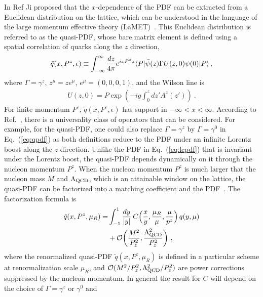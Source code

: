\documentclass[prd,aps,twocolumn,preprintnumbers,showpacs,nofootinbib,superscriptaddress,notitlepage]{revtex4-1}
\newcommand{\beq}{\begin{eqnarray}}
\newcommand{\eeq}{\end{eqnarray}}
\newcommand{\nn}{\nonumber}
\begin{document}
In Ref {\cite{Ji:2013dva}} Ji proposed that the $x$-dependence of the PDF can be extracted from a Euclidean distribution on the lattice, which can be understood in the language of the large momentum effective theory (LaMET)~\cite{Ji:2014gla}. This Euclidean distribution is referred to as the quasi-PDF, whose bare matrix element is defined using a spatial correlation of quarks along the $z$ direction,
\beq \label{eq:qpdf}
	\tilde{q}(x,P^z,\epsilon) \equiv \int_{-\infty}^\infty {dz\over 4\pi} e^{ixP^zz}\langle P | \bar{\psi}  (z) \Gamma U (z, 0) \psi (0) | P \rangle \,,\nn\\
\eeq
where $\Gamma=\gamma^z$, $z^\mu=ze^\mu$, $e^\mu=(0,0,0,1)$, and the Wilson line is
\beq
	U(z,0) = P\exp\left(-ig\int_0^z dz' A^z(z')\right)\ .
\eeq
For finite momentum $P^z$, $\tilde{q}(x,P^z,\epsilon)$ has support in $-\infty < x < \infty$.
According to Ref.~\cite{Hatta:2013gta}, there is a universality class of operators that can be considered. For example, for the quasi-PDF, one could also replace $\Gamma=\gamma^z$ by $\Gamma=\gamma^0$ in Eq.~(\ref{eq:qpdf}) as both definitions reduce to the PDF under an infinite Lorentz boost along the $z$ direction. Unlike the PDF in Eq.~(\ref{eq:lcpdf}) that is invariant under the Lorentz boost, the quasi-PDF depends dynamically on it through the nucleon momentum $P^z$. When the nucleon momentum $P^z$ is much larger that the nucleon mass $M$ and $\Lambda_{\rm QCD}$, which is an attainable window on the lattice, the quasi-PDF can be factorized
into a matching coefficient and the PDF~\cite{Ji:2013dva,Ji:2014gla}. The factorization formula is
\begin{align} \label{eq:momfact}
	\tilde{q}(x,P^z,\mu_R)
	=& \int_{-1}^1 {dy\over |y|}\: C\Bigl({x\over y},{\mu_R\over \mu},{\mu\over p^z}\Bigr) \, q(y,\mu)
	\nn\\
	& + \mathcal{O}\biggl({M^2\over P_z^2},{\Lambda_{\ensuremath{\operatorname{QCD}}}^2\over P_z^2}\biggr)\ ,
\end{align}
where the renormalized quasi-PDF $\tilde{q}(x,P^z,\mu_R)$ is defined in a particular scheme at renormalization scale $\mu_R$, and $\mathcal{O}(M^2/P_z^2, \Lambda_{\rm QCD}^2/P_z^2)$ are power corrections suppressed by the nucleon momentum. In general the result for $C$ will depend on the choice of $\Gamma=\gamma^z$ or $\gamma^0$ and
\end{document}
